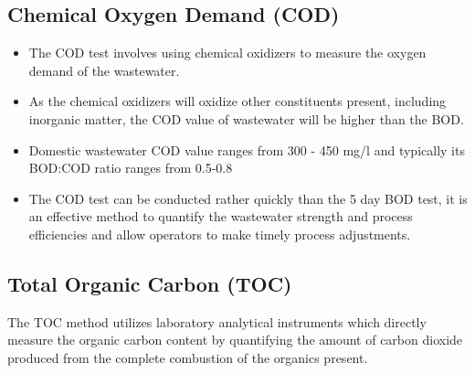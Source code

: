 			    \subsection{Chemical Oxygen Demand (COD)}
			      	\begin{itemize}
			      		\item The COD test involves using chemical oxidizers to measure the oxygen demand of the wastewater.
			      
			      		\item As the chemical oxidizers will oxidize other constituents present, including inorganic matter, the COD value of wastewater will be higher than the BOD.
			      		\item Domestic wastewater COD value ranges from 300 - 450 mg/l and typically its BOD:COD ratio ranges from 0.5-0.8 
			      		\item The COD test can be conducted rather quickly than the 5 day BOD test, it is an effective method to quantify the wastewater strength and process efficiencies and allow operators to make timely process adjustments.
			      	\end{itemize}
			    \subsection{Total Organic Carbon (TOC)}
			      	The TOC method utilizes laboratory analytical instruments which directly measure the organic carbon content by quantifying the amount of carbon dioxide produced from the complete combustion of the organics present.


